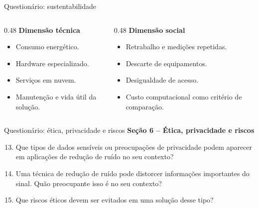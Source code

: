 \documentclass[aspectratio=1610,11pt]{beamer}
\begin{document}
{\begin{frame}[noframenumbering]{Questionário: sustentabilidade}
    \vspace{0.2cm}
    \begin{columns}[T,onlytextwidth]
        \begin{column}{0.48\textwidth}
            \textbf{Dimensão técnica}
            \begin{itemize}
                \item Consumo energético.
                \item Hardware especializado.
                \item Serviços em nuvem.
                \item Manutenção e vida útil da solução.
            \end{itemize}
        \end{column}
        \begin{column}{0.48\textwidth}
            \textbf{Dimensão social}
            \begin{itemize}
                \item Retrabalho e medições repetidas.
                \item Descarte de equipamentos.
                \item Desigualdade de acesso.
                \item Custo computacional como critério de comparação.
            \end{itemize}
        \end{column}
    \end{columns}
\end{frame}

\begin{frame}[noframenumbering]{Questionário: ética, privacidade e riscos}
    \footnotesize
    \textbf{Seção 6 -- Ética, privacidade e riscos}
    \begin{enumerate}
        \setcounter{enumi}{12}
        \item Que tipos de dados sensíveis ou preocupações de privacidade podem aparecer em aplicações de redução de ruído no seu contexto?
        \item Uma técnica de redução de ruído pode distorcer informações importantes do sinal. Quão preocupante isso é no seu contexto?
        \item Que riscos éticos devem ser evitados em uma solução desse tipo?
    \end{enumerate}


\end{frame}}
\end{document}
